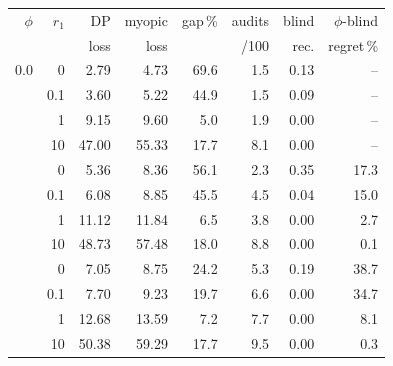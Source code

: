\footnotesize
\setlength{\tabcolsep}{3.2pt}
\begin{tabular}{@{}rr rrr rr r@{}}
\toprule
$\phi$ & $r_1$ & DP & myopic & gap\,\% & audits & blind & $\phi$-blind \\
 & & loss & loss & & /100 & rec. & regret\,\% \\
\midrule
0.0 & 0 & 2.79 & 4.73 & 69.6 & 1.5 & 0.13 & -- \\
 & 0.1 & 3.60 & 5.22 & 44.9 & 1.5 & 0.09 & -- \\
 & 1 & 9.15 & 9.60 & 5.0 & 1.9 & 0.00 & -- \\
 & 10 & 47.00 & 55.33 & 17.7 & 8.1 & 0.00 & -- \\
\addlinespace[1pt]
0.5 & 0 & 5.36 & 8.36 & 56.1 & 2.3 & 0.35 & 17.3 \\
 & 0.1 & 6.08 & 8.85 & 45.5 & 4.5 & 0.04 & 15.0 \\
 & 1 & 11.12 & 11.84 & 6.5 & 3.8 & 0.00 & 2.7 \\
 & 10 & 48.73 & 57.48 & 18.0 & 8.8 & 0.00 & 0.1 \\
\addlinespace[1pt]
1.0 & 0 & 7.05 & 8.75 & 24.2 & 5.3 & 0.19 & 38.7 \\
 & 0.1 & 7.70 & 9.23 & 19.7 & 6.6 & 0.00 & 34.7 \\
 & 1 & 12.68 & 13.59 & 7.2 & 7.7 & 0.00 & 8.1 \\
 & 10 & 50.38 & 59.29 & 17.7 & 9.5 & 0.00 & 0.3 \\
\bottomrule
\end{tabular}

